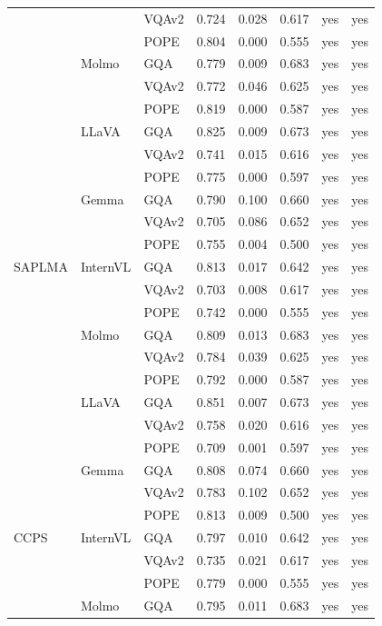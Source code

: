 \begin{longtable}{@{\extracolsep{\fill}}lll rr r cc@{}}
 &  & VQAv2 & 0.724 & 0.028 & 0.617 & yes & yes \\
 &  & POPE & 0.804 & 0.000 & 0.555 & yes & yes \\
\addlinespace
 & Molmo & GQA & 0.779 & 0.009 & 0.683 & yes & yes \\
 &  & VQAv2 & 0.772 & 0.046 & 0.625 & yes & yes \\
 &  & POPE & 0.819 & 0.000 & 0.587 & yes & yes \\
\addlinespace
 & LLaVA & GQA & 0.825 & 0.009 & 0.673 & yes & yes \\
 &  & VQAv2 & 0.741 & 0.015 & 0.616 & yes & yes \\
 &  & POPE & 0.775 & 0.000 & 0.597 & yes & yes \\
\addlinespace
 & Gemma & GQA & 0.790 & 0.100 & 0.660 & yes & yes \\
 &  & VQAv2 & 0.705 & 0.086 & 0.652 & yes & yes \\
 &  & POPE & 0.755 & 0.004 & 0.500 & yes & yes \\
\midrule
SAPLMA & InternVL & GQA & 0.813 & 0.017 & 0.642 & yes & yes \\
 &  & VQAv2 & 0.703 & 0.008 & 0.617 & yes & yes \\
 &  & POPE & 0.742 & 0.000 & 0.555 & yes & yes \\
\addlinespace
 & Molmo & GQA & 0.809 & 0.013 & 0.683 & yes & yes \\
 &  & VQAv2 & 0.784 & 0.039 & 0.625 & yes & yes \\
 &  & POPE & 0.792 & 0.000 & 0.587 & yes & yes \\
\addlinespace
 & LLaVA & GQA & 0.851 & 0.007 & 0.673 & yes & yes \\
 &  & VQAv2 & 0.758 & 0.020 & 0.616 & yes & yes \\
 &  & POPE & 0.709 & 0.001 & 0.597 & yes & yes \\
\addlinespace
 & Gemma & GQA & 0.808 & 0.074 & 0.660 & yes & yes \\
 &  & VQAv2 & 0.783 & 0.102 & 0.652 & yes & yes \\
 &  & POPE & 0.813 & 0.009 & 0.500 & yes & yes \\
\midrule
CCPS & InternVL & GQA & 0.797 & 0.010 & 0.642 & yes & yes \\
 &  & VQAv2 & 0.735 & 0.021 & 0.617 & yes & yes \\
 &  & POPE & 0.779 & 0.000 & 0.555 & yes & yes \\
\addlinespace
 & Molmo & GQA & 0.795 & 0.011 & 0.683 & yes & yes \\

\end{longtable}
